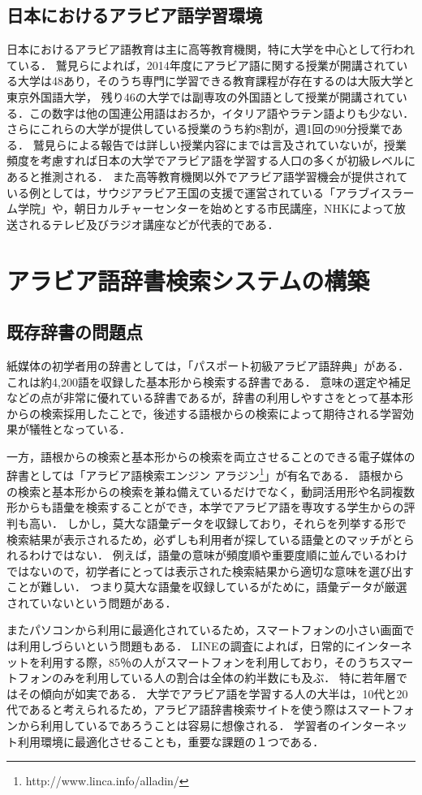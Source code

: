 \documentclass[technicalreport]{ieicej}
\begin{document}
\subsection{日本におけるアラビア語学習環境}
日本におけるアラビア語教育は主に高等教育機関，特に大学を中心として行われている．
鷲見らによれば，2014年度にアラビア語に関する授業が開講されている大学は48あり，そのうち専門に学習できる教育課程が存在するのは大阪大学と東京外国語大学， 残り46の大学では副専攻の外国語として授業が開講されている．この数字は他の国連公用語はおろか，イタリア語やラテン語よりも少ない．
さらにこれらの大学が提供している授業のうち約8割が，週1回の90分授業である．
鷲見らによる報告では詳しい授業内容にまでは言及されていないが，授業頻度を考慮すれば日本の大学でアラビア語を学習する人口の多くが初級レベルにあると推測される．
また高等教育機関以外でアラビア語学習機会が提供されている例としては，サウジアラビア王国の支援で運営されている「アラブイスラーム学院」や，朝日カルチャーセンターを始めとする市民講座，NHKによって放送されるテレビ及びラジオ講座などが代表的である．

\section{アラビア語辞書検索システムの構築}
\subsection{既存辞書の問題点}
紙媒体の初学者用の辞書としては，「パスポート初級アラビア語辞典」がある．
これは約4,200語を収録した基本形から検索する辞書である．
意味の選定や補足などの点が非常に優れている辞書であるが，辞書の利用しやすさをとって基本形からの検索採用したことで，後述する語根からの検索によって期待される学習効果が犠牲となっている．

一方，語根からの検索と基本形からの検索を両立させることのできる電子媒体の辞書としては「アラビア語検索エンジン アラジン\footnote{http://www.linca.info/alladin/}」が有名である．
語根からの検索と基本形からの検索を兼ね備えているだけでなく，動詞活用形や名詞複数形からも語彙を検索することができ，本学でアラビア語を専攻する学生からの評判も高い．
しかし，莫大な語彙データを収録しており，それらを列挙する形で検索結果が表示されるため，必ずしも利用者が探している語彙とのマッチがとられるわけではない．
例えば，語彙の意味が頻度順や重要度順に並んでいるわけではないので，初学者にとっては表示された検索結果から適切な意味を選び出すことが難しい．
つまり莫大な語彙を収録しているがために，語彙データが厳選されていないという問題がある．

またパソコンから利用に最適化されているため，スマートフォンの小さい画面では利用しづらいという問題もある．
LINEの調査によれば，日常的にインターネットを利用する際，85％の人がスマートフォンを利用しており，そのうちスマートフォンのみを利用している人の割合は全体の約半数にも及ぶ．
特に若年層ではその傾向が如実である．
大学でアラビア語を学習する人の大半は，10代と20代であると考えられるため，アラビア語辞書検索サイトを使う際はスマートフォンから利用しているであろうことは容易に想像される．
学習者のインターネット利用環境に最適化させることも，重要な課題の１つである．
\end{document}
